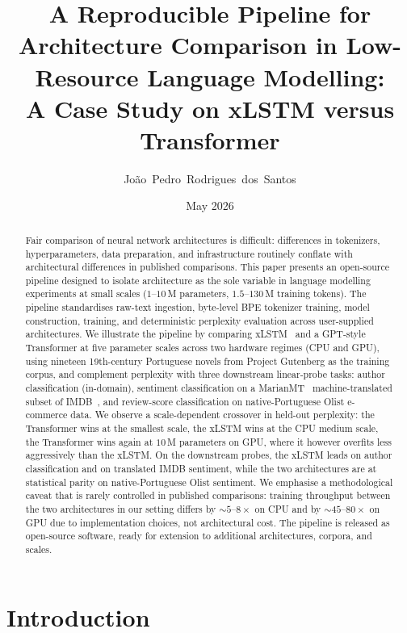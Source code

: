 \documentclass[11pt]{article}
\title{A Reproducible Pipeline for Architecture Comparison in
       Low-Resource Language Modelling:\\
       A Case Study on xLSTM versus Transformer}
\author[1]{João~Pedro~Rodrigues~dos~Santos}
\affil[1]{Computer Engineering, Insper, São Paulo, Brazil}
\date{May 2026}
\begin{document}
\maketitle

\begin{abstract}
\noindent
Fair comparison of neural network architectures is difficult: differences in
tokenizers, hyperparameters, data preparation, and infrastructure routinely
conflate with architectural differences in published comparisons. This paper
presents an open-source pipeline designed to isolate architecture as the
sole variable in language modelling experiments at small scales
($1$--$10$\,M parameters, $1.5$--$130$\,M training tokens). The pipeline
standardises raw-text ingestion, byte-level BPE tokenizer training, model
construction, training, and deterministic perplexity evaluation across
user-supplied architectures. We illustrate the pipeline by comparing
xLSTM~\cite{beck2024} and a GPT-style Transformer at five parameter scales
across two hardware regimes (CPU and GPU), using nineteen 19th-century
Portuguese novels from Project Gutenberg as the training corpus, and
complement perplexity with three downstream linear-probe tasks: author
classification (in-domain), sentiment classification on a
MarianMT~\cite{junczys2018marian,tiedemann2020opus} machine-translated
subset of IMDB~\cite{maas2011imdb}, and review-score classification on
native-Portuguese Olist e-commerce data. We observe a scale-dependent
crossover in held-out perplexity: the Transformer wins at the smallest
scale, the xLSTM wins at the CPU medium scale, the Transformer wins again
at $10$\,M parameters on GPU, where it however overfits less aggressively
than the xLSTM. On the downstream probes, the xLSTM leads on author
classification and on translated IMDB sentiment, while the two architectures
are at statistical parity on native-Portuguese Olist sentiment. We
emphasise a methodological caveat that is rarely controlled in published
comparisons: training throughput between the two architectures in our
setting differs by $\sim$$5$--$8\times$ on CPU and by $\sim$$45$--$80\times$
on GPU due to implementation choices, not architectural cost. The pipeline
is released as open-source software, ready for extension to additional
architectures, corpora, and scales.
\end{abstract}

\section{Introduction}
\end{document}
